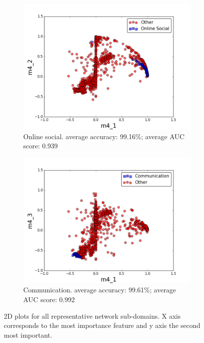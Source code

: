 \documentclass{article}
\begin{document}
\begin{figure}[H]
\medskip
\begin{subfigure}{0.48\textwidth}
\includegraphics[width=\linewidth]{figs/one_by_many/online_social/2d.png}
\caption{Online social. average accuracy: 99.16\%; average AUC score: 0.939} \label{online_social_2d}
\end{subfigure}\hspace*{\fill}
\begin{subfigure}{0.48\textwidth}
\includegraphics[width=\linewidth]{figs/one_by_many/communication/2d.png}
\caption{Communication. average accuracy: 99.61\%; average AUC score: 0.992} \label{communication_2d}
\end{subfigure}

\caption{2D plots for all representative network sub-domains. X axis corresponds to the most importance feature and y axis the second most important.} \label{2d_figures}
\end{figure}
\end{document}
